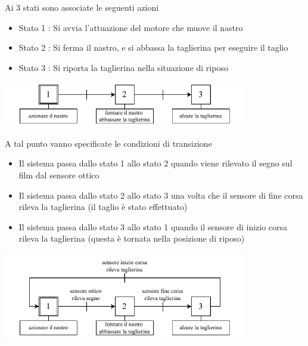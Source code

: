 \documentclass[10pt, letterpaper]{report}
\begin{document}
Ai 3  stati sono associate le seguenti azioni \begin{itemize}
    \item Stato 1 : Si avvia l'attuazione del motore che muove il nastro  
    \item Stato 2 : Si ferma il nastro, e si abbassa la taglierina per eseguire il taglio 
    \item Stato 3 : Si riporta la taglierina nella situazione di riposo
\end{itemize}
\begin{center}
    \includegraphics[width=0.8\textwidth ]{images/SFC3.pdf}
\end{center}
A  tal punto vanno specificate le condizioni di transizione\begin{itemize}
    \item Il sistema passa dallo stato 1 allo stato 2 quando viene rilevato il segno sul film dal sensore ottico 
    \item Il sistema passa dallo stato 2 allo stato 3 una volta che il sensore di fine corsa rileva la taglierina (il taglio è stato effettuato) 
    \item Il sistema passa dallo stato 3 allo stato 1 quando il sensore di inizio corsa rileva la taglierina (questa è tornata nella posizione di riposo)
\end{itemize}
\begin{center}
    \includegraphics[width=0.8\textwidth ]{images/SFC4.pdf}
\end{center}
\end{document}
